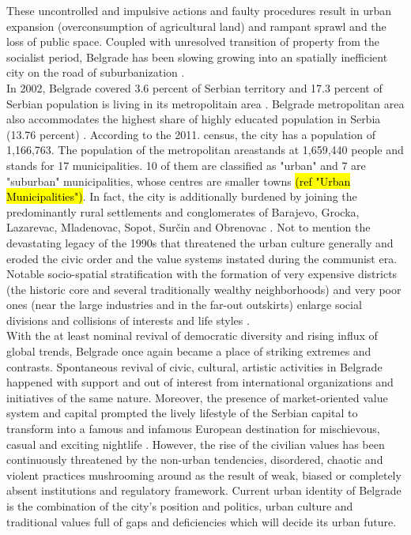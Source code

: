 \documentclass[11pt]{report}
\begin{document}
These uncontrolled and impulsive actions and faulty procedures result in urban expansion (overconsumption of agricultural land) and rampant sprawl and the loss of public space. Coupled with unresolved transition of property from the socialist period, Belgrade has been slowing growing into an spatially inefficient city  on the road of suburbanization \cite{Zekovic et al. 2015}.
\\
In 2002, Belgrade covered 3.6 percent of Serbian territory and 17.3 percent of Serbian population is living in its metropolitain area \cite{Cities in Transition 2013}.
Belgrade metropolitan area also accommodates the highest share of highly educated population in Serbia (13.76 percent) \cite{Vukmirovic et al 2013}.
According to the 2011. census, the city has a population of 1,166,763.
The population of the metropolitan area\footnotemark stands at 1,659,440 people and stands for 17 municipalities. 10 of them are classified as "urban" and 7 are "suburban" municipalities, whose centres are smaller towns \hl{(ref "Urban Municipalities")}.
In fact, the  city  is additionally burdened by joining the predominantly rural  settlements  and  conglomerates  of Barajevo, Grocka,  Lazarevac,  Mladenovac,  Sopot,  Surčin  and Obrenovac \cite{Samardzic in Doytchinov 2015}.
Not to mention the devastating legacy of the 1990s that threatened the  urban  culture generally and eroded the civic order and the value systems instated during the communist era.
Notable socio-spatial stratification with the formation of very expensive districts (the historic core and several traditionally wealthy neighborhoods) and very poor ones (near the large industries and in the far-out outskirts) enlarge social divisions and collisions of interests and life styles   \cite{(Hirt 2009)}.
\\
With the at least nominal revival of democratic diversity and rising influx of global trends, Belgrade once again became a place of striking extremes and contrasts. 
Spontaneous revival of civic, cultural, artistic activities in Belgrade happened with support and out of interest from international organizations and initiatives of the same nature. Moreover, the presence of market-oriented value system and capital prompted the lively lifestyle of the Serbian capital to transform into a famous and infamous European destination for mischievous, casual and exciting nightlife \cite{Vanista Lazarevic in Doytchinov 2015}.
However, the rise of the civilian values has been continuously threatened by the non-urban tendencies,  disordered,  chaotic  and violent practices mushrooming around as the result of weak, biased or completely absent institutions and regulatory framework. Current urban identity of Belgrade is the combination of the city's position and politics, urban culture and traditional values full of gaps and deficiencies which will decide its urban future.
\end{document}
